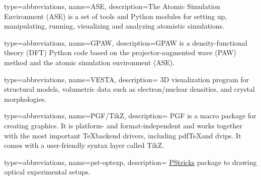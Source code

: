 


{ type=abbreviations,
    name={ASE},
    description={The Atomic Simulation Environment (ASE) is a set of tools and Python modules for setting up, 
    manipulating, running, visualizing and analyzing atomistic simulations. \cite{ask2017ase}}
}

{ type=abbreviations,
    name={GPAW},
    description={GPAW is a density-functional theory (DFT) Python code based on the projector-augmented wave (PAW) method and the atomic simulation environment (ASE). \cite{gpaw}}
}




{ type=abbreviations,
    name={VESTA},
    description=
    {
    3D visualization program for structural models, volumetric data such as electron/nuclear 
    densities, and crystal morphologies. 
    \cite{momma2011vesta}
    }
}

{ 
    type=abbreviations,
    name={PGF/TikZ},
    description=
    {
    PGF is a macro package for creating graphics. It is platform- and format-independent and works together 
    with the most important \TeX backend drivers, including pdf\TeX  and dvips. It comes with a user-friendly 
    syntax layer called TikZ. 
    \cite{pgftikz}
    }
}

{ 
    type=abbreviations,
    name={pst-optexp},
    description=
    {
    \href{https://tug.org/PSTricks/main.cgi/}{PStricks} package to drawing optical experimental setups.
    \cite{optexp}
    }
}





